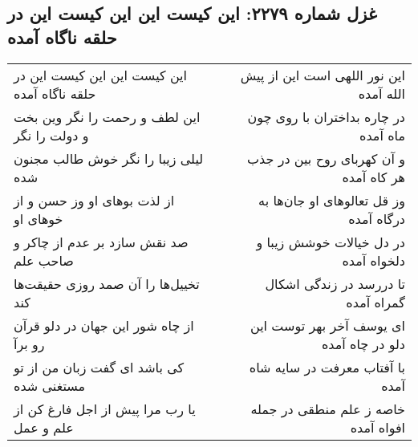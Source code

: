 \begin{center}
\section*{غزل شماره ۲۲۷۹: این کیست این این کیست این در حلقه ناگاه آمده}
\label{sec:2279}
\begin{longtable}{l p{0.5cm} r}
این کیست این این کیست این در حلقه ناگاه آمده
&&
این نور اللهی است این از پیش الله آمده
\\
این لطف و رحمت را نگر وین بخت و دولت را نگر
&&
در چاره بداختران با روی چون ماه آمده
\\
لیلی زیبا را نگر خوش طالب مجنون شده
&&
و آن کهربای روح بین در جذب هر کاه آمده
\\
از لذت بوهای او وز حسن و از خوهای او
&&
وز قل تعالوهای او جان‌ها به درگاه آمده
\\
صد نقش سازد بر عدم از چاکر و صاحب علم
&&
در دل خیالات خوشش زیبا و دلخواه آمده
\\
تخییل‌ها را آن صمد روزی حقیقت‌ها کند
&&
تا دررسد در زندگی اشکال گمراه آمده
\\
از چاه شور این جهان در دلو قرآن رو برآ
&&
ای یوسف آخر بهر توست این دلو در چاه آمده
\\
کی باشد ای گفت زبان من از تو مستغنی شده
&&
با آفتاب معرفت در سایه شاه آمده
\\
یا رب مرا پیش از اجل فارغ کن از علم و عمل
&&
خاصه ز علم منطقی در جمله افواه آمده
\\
\end{longtable}
\end{center}
